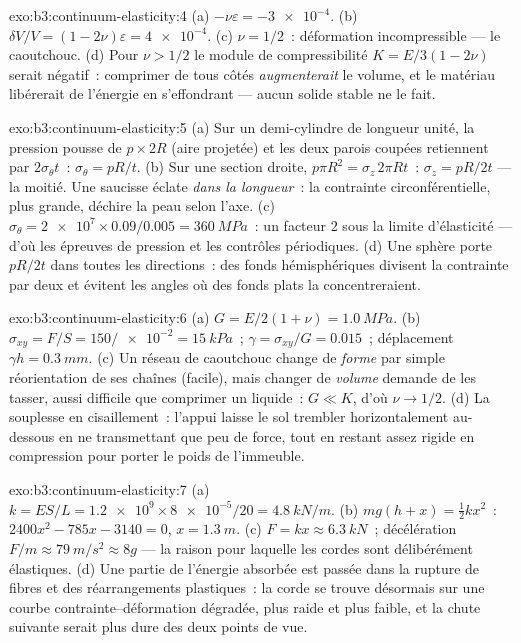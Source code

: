 \begin{solution}{exo:b3:continuum-elasticity:4}
(a) $-\nu\varepsilon = \num{-3e-4}$. (b) $\delta V/V = (1 -
2\nu)\varepsilon = \num{4e-4}$. (c) $\nu = 1/2$~: déformation
incompressible --- le caoutchouc. (d) Pour $\nu > 1/2$ le module de compressibilité $K =
E/3(1 - 2\nu)$ serait négatif~: comprimer de tous côtés
\emph{augmenterait} le volume, et le matériau libérerait de l'énergie
en s'effondrant --- aucun solide stable ne le fait.
\end{solution}

\begin{solution}{exo:b3:continuum-elasticity:5}
(a) Sur un demi-cylindre de longueur unité, la pression pousse de $p
\times 2R$ (aire projetée) et les deux parois coupées retiennent par
$2\sigma_\theta t$~: $\sigma_\theta = pR/t$. (b) Sur une section
droite, $p\pi R^2 = \sigma_z\,2\pi Rt$~: $\sigma_z = pR/2t$ --- la
moitié. Une saucisse éclate \emph{dans la longueur}~: la contrainte
circonférentielle, plus grande, déchire la peau selon l'axe. (c) $\sigma_\theta = \num{2e7} \times
0.09/0.005 = \qty{360}{MPa}$~: un facteur $2$ sous la limite
d'élasticité --- d'où les épreuves de pression et les contrôles
périodiques. (d) Une sphère porte $pR/2t$ dans toutes les directions~:
des fonds hémisphériques divisent la contrainte par deux et évitent les
angles où des fonds plats la concentreraient.
\end{solution}

\begin{solution}{exo:b3:continuum-elasticity:6}
(a) $G = E/2(1 + \nu) = \qty{1.0}{MPa}$. (b) $\sigma_{xy} = F/S =
150/\num{e-2} = \qty{15}{kPa}$~; $\gamma = \sigma_{xy}/G = 0.015$~;
déplacement $\gamma h = \qty{0.3}{mm}$. (c) Un réseau de caoutchouc
change de \emph{forme} par simple réorientation de ses chaînes
(facile), mais changer de \emph{volume} demande de les tasser, aussi
difficile que comprimer un liquide~: $G \ll K$, d'où $\nu \to 1/2$.
(d) La souplesse en cisaillement~: l'appui laisse le sol trembler
horizontalement au-dessous en ne transmettant que peu de force, tout
en restant assez rigide en compression pour porter le poids de
l'immeuble.
\end{solution}

\begin{solution}{exo:b3:continuum-elasticity:7}
(a) $k = ES/L = \num{1.2e9} \times \num{8e-5}/20 = \qty{4.8}{kN/m}$.
(b) $mg(h + x) = \tfrac12 kx^2$~: $2400x^2 - 785x - 3140 = 0$, $x =
\qty{1.3}{m}$. (c) $F = kx \approx \qty{6.3}{kN}$~; décélération $F/m
\approx \qty{79}{m/s^2} \approx 8g$ --- la raison pour laquelle les
cordes sont délibérément élastiques. (d) Une partie de l'énergie
absorbée est passée dans la rupture de fibres et des réarrangements
plastiques~: la corde se trouve désormais sur une courbe
contrainte--déformation dégradée, plus raide et plus faible, et la
chute suivante serait plus dure des deux points de vue.
\end{solution}

